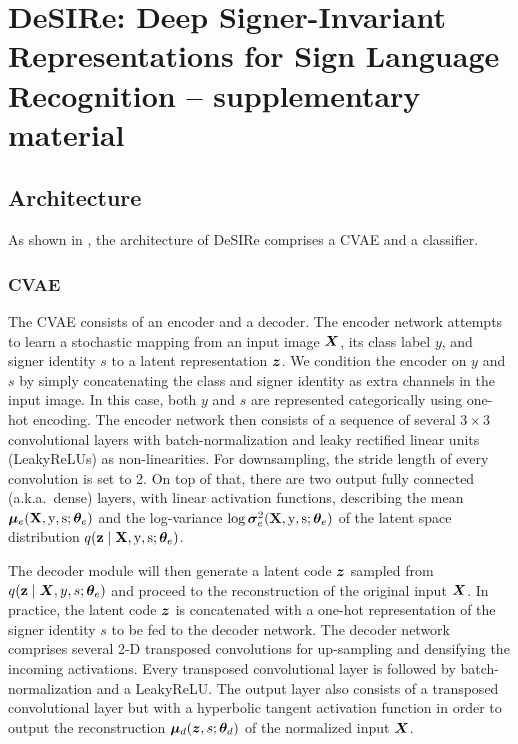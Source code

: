 
\chapter{DeSIRe: Deep Signer-Invariant Representations for Sign Language Recognition -- supplementary material} %

\label{appendix:desire} %

\section{Architecture}
\label{sec:desire_arch}
As shown in , the architecture of DeSIRe comprises a CVAE and a classifier.



\subsection{CVAE}
The CVAE consists of an encoder and a decoder. The encoder network attempts to learn a stochastic mapping from an input image ${\bm{X}}$, its class label $y$, and signer identity $s$ to a latent representation ${\bm{z}}$. We condition the encoder on $y$ and $s$ by simply concatenating the class and signer identity as extra channels in the input image. In this case, both $y$ and $s$ are represented categorically using one-hot encoding. The encoder network then consists of a sequence of several $3\times 3$ convolutional layers with batch-normalization and leaky rectified linear units (LeakyReLUs) as non-linearities. For downsampling, the stride length of every convolution is set to 2. On top of that, there are two output fully connected (a.k.a.\ dense) layers, with linear activation functions, describing the mean ${\bm{\mu}}_e({\mathbf{X}},{\textnormal{y}},{\textnormal{s}}; {\bm{\theta}}_e)$ and the log-variance $\log {\bm{\sigma}}_e^2({\mathbf{X}},{\textnormal{y}},{\textnormal{s}}; {\bm{\theta}}_e)$ of the latent space distribution $q({\mathbf{z}} \mid {\mathbf{X}}, {\textnormal{y}}, {\textnormal{s}}; {\bm{\theta}}_e)$.

The decoder module will then generate a latent code ${\bm{z}}$ sampled from $q({\mathbf{z}} \mid {\bm{X}}, y, s; {\bm{\theta}}_e)$ and proceed to the reconstruction of the original input ${\bm{X}}$. In practice, the latent code ${\bm{z}}$ is concatenated with a one-hot representation of the signer identity $s$ to be fed to the decoder network. The decoder network comprises several 2-D transposed convolutions for up-sampling and densifying the incoming activations. Every transposed convolutional layer is followed by batch-normalization and a LeakyReLU. The output layer also consists of a transposed convolutional layer but with a hyperbolic tangent activation function in order to output the reconstruction ${\bm{\mu}}_d({\bm{z}},s; {\bm{\theta}}_d)$ of the normalized input ${\bm{X}}$.

